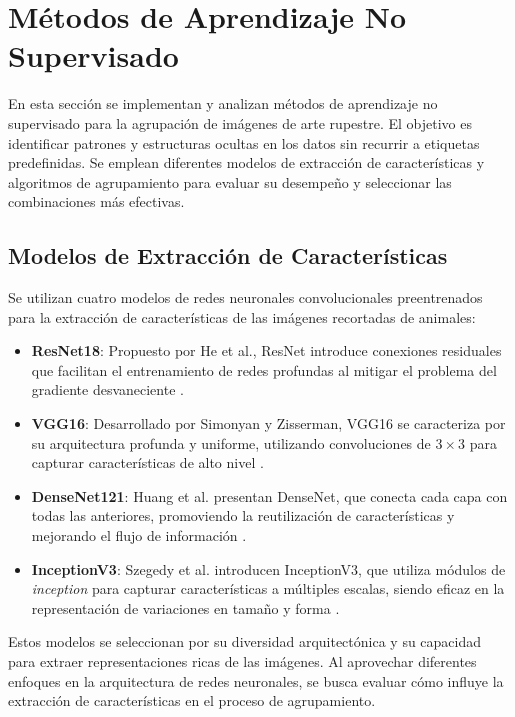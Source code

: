 \section{Métodos de Aprendizaje No Supervisado}

En esta sección se implementan y analizan métodos de aprendizaje no supervisado para la agrupación de imágenes de arte rupestre. El objetivo es identificar patrones y estructuras ocultas en los datos sin recurrir a etiquetas predefinidas. Se emplean diferentes modelos de extracción de características y algoritmos de agrupamiento para evaluar su desempeño y seleccionar las combinaciones más efectivas.

\subsection{Modelos de Extracción de Características}

Se utilizan cuatro modelos de redes neuronales convolucionales preentrenados para la extracción de características de las imágenes recortadas de animales:

\begin{itemize} \item \textbf{ResNet18}: Propuesto por He et al., ResNet introduce conexiones residuales que facilitan el entrenamiento de redes profundas al mitigar el problema del gradiente desvaneciente \cite{he2016deep}. \item \textbf{VGG16}: Desarrollado por Simonyan y Zisserman, VGG16 se caracteriza por su arquitectura profunda y uniforme, utilizando convoluciones de $3 \times 3$ para capturar características de alto nivel \cite{simonyan2014very}. \item \textbf{DenseNet121}: Huang et al. presentan DenseNet, que conecta cada capa con todas las anteriores, promoviendo la reutilización de características y mejorando el flujo de información \cite{huang2017densely}. \item \textbf{InceptionV3}: Szegedy et al. introducen InceptionV3, que utiliza módulos de \textit{inception} para capturar características a múltiples escalas, siendo eficaz en la representación de variaciones en tamaño y forma \cite{szegedy2016rethinking}. \end{itemize}

Estos modelos se seleccionan por su diversidad arquitectónica y su capacidad para extraer representaciones ricas de las imágenes. Al aprovechar diferentes enfoques en la arquitectura de redes neuronales, se busca evaluar cómo influye la extracción de características en el proceso de agrupamiento.

